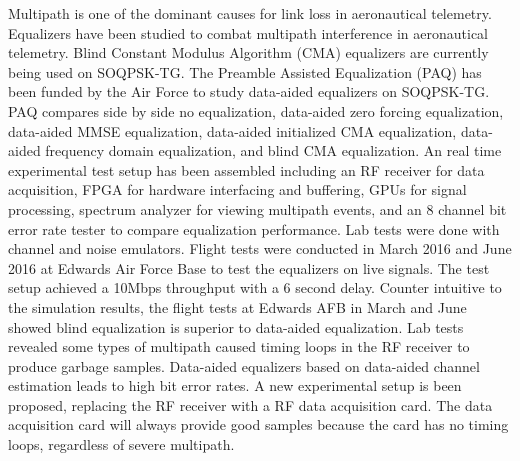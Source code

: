 Multipath is one of the dominant causes for link loss in aeronautical telemetry.
Equalizers have been studied to combat multipath interference in aeronautical telemetry.
Blind Constant Modulus Algorithm (CMA) equalizers are currently being used on SOQPSK-TG.
The Preamble Assisted Equalization (PAQ) has been funded by the Air Force to study data-aided equalizers on SOQPSK-TG.
PAQ compares side by side no equalization, data-aided zero forcing equalization, data-aided MMSE equalization, data-aided initialized CMA equalization, data-aided frequency domain equalization, and blind CMA equalization.
An real time experimental test setup has been assembled including an RF receiver for data acquisition, FPGA for hardware interfacing and buffering, GPUs for signal processing, spectrum analyzer for viewing multipath events, and an 8 channel bit error rate tester to compare equalization performance. 
Lab tests were done with channel and noise emulators.
Flight tests were conducted in March 2016 and June 2016 at Edwards Air Force Base to test the equalizers on live signals.
The test setup achieved a 10Mbps throughput with a 6 second delay.
Counter intuitive to the simulation results, the flight tests at Edwards AFB in March and June showed blind equalization is superior to data-aided equalization.
Lab tests revealed some types of multipath caused timing loops in the RF receiver to produce garbage samples.
Data-aided equalizers based on data-aided channel estimation leads to high bit error rates.
A new experimental setup is been proposed, replacing the RF receiver with a RF data acquisition card. The data acquisition card will always provide good samples because the card has no timing loops, regardless of severe multipath.
